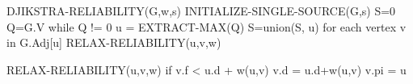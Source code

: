 DJIKSTRA-RELIABILITY(G,w,s)
	INITIALIZE-SINGLE-SOURCE(G,s)
	S=0
	Q=G.V
	while Q != 0
		u = EXTRACT-MAX(Q)
		S=union(S, {u})
		for each vertex v in G.Adj[u]
			RELAX-RELIABILITY(u,v,w)

RELAX-RELIABILITY(u,v,w)
	if v.f < u.d + w(u,v)
		v.d = u.d+w(u,v)
		v.pi  = u